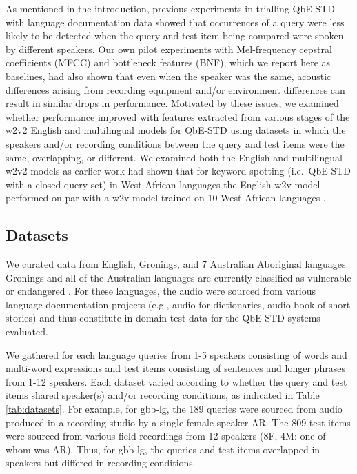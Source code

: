 \documentclass{article}
\begin{document}
As mentioned in the introduction, previous experiments in \cite{leferrandEnablingInteractiveTranscription2020} trialling QbE-STD with language documentation data showed that occurrences of a query were less likely to be detected when the query and test item being compared were spoken by different speakers.
Our own pilot experiments with Mel-frequency cepstral coefficients (MFCC) and bottleneck features (BNF), which we report here as baselines, had also shown that even when the speaker was the same, acoustic differences arising from recording equipment and/or environment differences can result in similar drops in performance.
Motivated by these issues, we examined whether performance improved with features extracted from various stages of the w2v2 English and multilingual models for QbE-STD using datasets in which the speakers and/or recording conditions between the query and test items were the same, overlapping, or different.
We examined both the English and multilingual w2v2 models as earlier work had shown that for keyword spotting (i.e.~QbE-STD with a closed query set) in West African languages the English w2v model performed on par with a w2v model trained on 10 West African languages \cite{doumbouya2021usingradio}.

\subsection{Datasets}

We curated data from English, Gronings, and 7 Australian Aboriginal languages.
Gronings and all of the Australian languages are currently classified as vulnerable or endangered \cite{eberhard_ethnologue_2020}. 
For these languages, the audio were sourced from various language documentation projects (e.g., audio for dictionaries, audio book of short stories) and thus constitute in-domain test data for the QbE-STD systems evaluated.

We gathered for each language queries from 1-5 speakers consisting of words and multi-word expressions and test items consisting of sentences and longer phrases from 1-12 speakers.
Each dataset varied according to whether the query and test items shared speaker(s) and/or recording conditions, as indicated in Table \ref{tab:datasets}.
For example, for gbb-lg, the 189 queries were sourced from audio produced in a recording studio by a single female speaker AR.
The 809 test items were sourced from various field recordings from 12 speakers (8F, 4M: one of whom was AR).
Thus, for gbb-lg, the queries and test items overlapped in speakers but differed in recording conditions.
\end{document}
